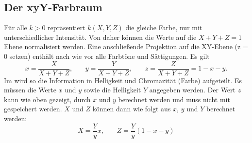 \subsection{Der xyY-Farbraum}
Für alle $k > 0$ repräsentiert $k(X, Y, Z)$ die gleiche Farbe, nur mit unterschiedlicher Intensität.
Von daher können die Werte auf die $X + Y + Z = 1$ Ebene normalisiert werden.
Eine anschließende Projektion auf die XY-Ebene (z = 0 setzen) enthält nach wie vor alle Farbtöne und Sättigungen.
Es gilt
\[
	x = \frac{X}{X + Y + Z} \text{,} \qquad
	y = \frac{Y}{X + Y + Z} \text{,} \qquad
	z = \frac{Z}{X + Y + Z} = 1 - x - y \text{.}
\]
Im  wird so die Information in Helligkeit und Chromazität (Farbe) aufgeteilt.
Es müssen die Werte $x$ und $y$ sowie die Helligkeit $Y$ angegeben werden.
Der Wert $z$ kann wie oben gezeigt, durch $x$ und $y$ berechnet werden und muss nicht mit gespeichert werden.
$X$ und $Z$ können dann wie folgt aus $x$, $y$ und $Y$ berechnet werden:
\[
	X = \frac{Y}{y}x \text{,} \qquad
	Z = \frac{Y}{y}(1 - x - y)
\]
